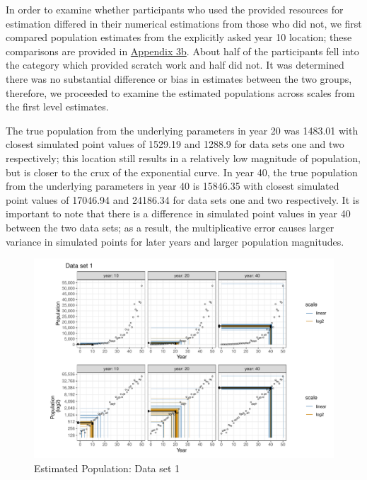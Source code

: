 \documentclass[print]{nuthesis}
\begin{document}
In order to examine whether participants who used the provided resources for estimation differed in their numerical estimations from those who did not, we first compared population estimates from the explicitly asked year 10 location; these comparisons are provided in \protect\hyperlink{estimation-comparison}{Appendix 3b}.
About half of the participants fell into the category which provided scratch work and half did not.
It was determined there was no substantial difference or bias in estimates between the two groups, therefore, we proceeded to examine the estimated populations across scales from the first level estimates.

The true population from the underlying parameters in year 20 was 1483.01 with closest simulated point values of 1529.19 and 1288.9 for data sets one and two respectively; this location still results in a relatively low magnitude of population, but is closer to the crux of the exponential curve.
In year 40, the true population from the underlying parameters in year 40 is 15846.35 with closest simulated point values of 17046.94 and 24186.34 for data sets one and two respectively.
It is important to note that there is a difference in simulated point values in year 40 between the two data sets; as a result, the multiplicative error causes larger variance in simulated points for later years and larger population magnitudes.

\begin{figure}[tbp]

{\centering \includegraphics[width=1\linewidth,]{thesis_files/figure-latex/spaghetti-dataset1-1} 

}

\caption{Estimated Population: Data set 1}\label{fig:spaghetti-dataset1}
\end{figure}
\end{document}
